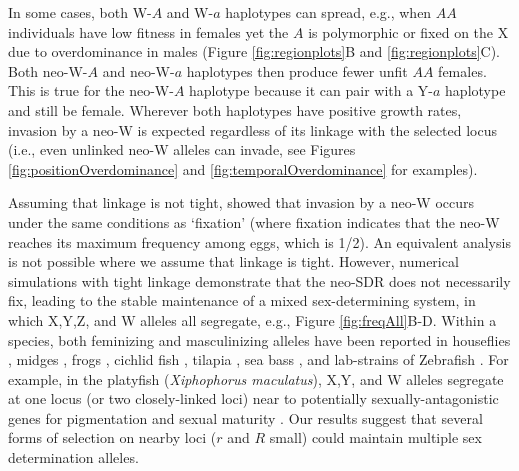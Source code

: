 \documentclass[12pt]{article}
\begin{document}
In some cases, both W-$A$ and W-$a$ haplotypes can spread, e.g., when $AA$ individuals have low fitness in females yet the $A$ is polymorphic or fixed on the X due to overdominance in males (Figure \ref{fig:regionplots}B and \ref{fig:regionplots}C).
Both neo-W-$A$ and neo-W-$a$ haplotypes then produce fewer unfit $AA$ females.
This is true for the neo-W-$A$ haplotype because it can pair with a Y-$a$ haplotype and still be female. 
Wherever both haplotypes have positive growth rates, invasion by a neo-W is expected regardless of its linkage with the selected locus (i.e., even unlinked neo-W alleles can invade, see Figures \ref{fig:positionOverdominance} and \ref{fig:temporalOverdominance} for examples). 

Assuming that linkage is not tight, \citet{vanDoorn:2010hu} showed that invasion by a neo-W occurs under the same conditions as `fixation' (where fixation indicates that the neo-W reaches its maximum frequency among eggs, which is 1/2). 
An equivalent analysis is not possible where we assume that linkage is tight. 
However, numerical simulations with tight linkage demonstrate that the neo-SDR does not necessarily fix, leading to the stable maintenance of a mixed sex-determining system, in which X,Y,Z, and W alleles all segregate, e.g., Figure \ref{fig:freqAll}B-D. 
Within a species, both feminizing and masculinizing alleles have been reported in houseflies \citep{Macdonald1978}, midges \citep{Thompson1971}, frogs \citep{Ogata:2007jm}, cichlid fish \citep{Ser:2010iq}, tilapia \citep{Lee2004}, sea bass \citep{Vandeputte2007}, and lab-strains of Zebrafish \citep{Liew2012,Wilson2014}. 
For example, in the platyfish (\textit{Xiphophorus maculatus}), X,Y, and W alleles segregate at one locus (or two closely-linked loci) near to potentially sexually-antagonistic genes for pigmentation and sexual maturity \citep{Kallman1965,Kallman1968, Volff2001, Schultheis2006}. 
Our results suggest that several forms of selection on nearby loci ($r$ and $R$ small) could maintain multiple sex determination alleles. 

\end{document}

